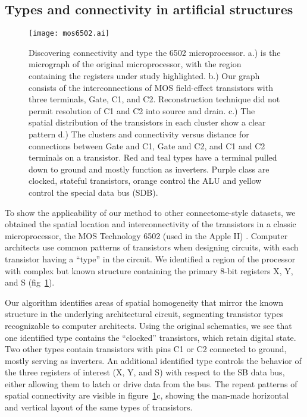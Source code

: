 \subsection*{Types and connectivity in artificial structures}
\begin{figure}
  \centering 
  \centerline{\texttt{[image: mos6502.ai]}}
  \caption{Discovering connectivity and type the 6502 microprocessor.
    a.) is the micrograph of the original microprocessor, with the
    region containing the registers under study highlighted. b.) Our
    graph consists of the interconnections of MOS field-effect
    transistors with three terminals, Gate, C1, and C2. Reconstruction
    technique did not permit resolution of C1 and C2 into source and
    drain. c.) The spatial distribution of the transistors in each
    cluster show a clear pattern d.) The clusters and connectivity
    versus distance for connections between Gate and C1, Gate and C2,
    and C1 and C2 terminals on a transistor. Red and teal types have a
    terminal pulled down to ground and mostly function as
    inverters. Purple class are clocked, stateful transistors, orange
    control the ALU and yellow control the special data bus (SDB).}
  \label{fig:mos6502}
\end{figure}


To show the applicability of our method to other connectome-style
datasets, we obtained the spatial location and interconnectivity of
the transistors in a classic microprocessor, the MOS Technology 6502
(used in the Apple II) \autocite{James2010}. Computer architects use
common patterns of transistors when designing circuits, with each
transistor having a ``type'' in the circuit. We identified a region of
the processor with complex but known structure containing the primary
8-bit registers X, Y, and S (fig~\ref{fig:mos6502}).

Our algorithm identifies areas of spatial homogeneity that mirror the
known structure in the underlying architectural circuit, segmenting
transistor types recognizable to computer architects. Using the
original schematics, we see that one identified type contains the
``clocked'' transistors, which retain digital state. Two other types
contain transistors with pins C1 or C2 connected to ground, mostly
serving as inverters.  An additional identified type controls the
behavior of the three registers of interest (X, Y, and S) with respect
to the SB data bus, either allowing them to latch or drive data from
the bus. The repeat patterns of spatial connectivity are visible in
figure~\ref{fig:mos6502}c, showing the man-made horizontal and
vertical layout of the same types of transistors.

